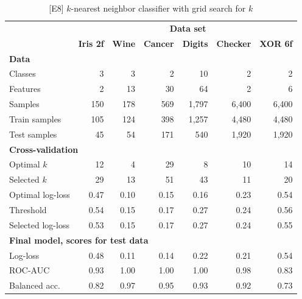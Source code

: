 \begin{table}
\caption{[E8] $k$-nearest neighbor classifier with grid search for $k$}
\label{tab_e8}
%
\begin{center}
\small
\begin{tabular}{|lrrrrrr|}
\hline
&\multicolumn{6}{c|}{\textbf{\hrulefill\ Data set \hrulefill}}\\
&\textbf{Iris 2f}&\textbf{Wine}&\textbf{Cancer}&\textbf{Digits}&\textbf{Checker}&\textbf{XOR 6f}\\
\multicolumn{7}{|l|}{\textbf{Data}}\\
Classes&3&3&2&10&2&2\\
Features&2&13&30&64&2&6\\
Samples&150&178&569&1,797&6,400&6,400\\
Train samples&105&124&398&1,257&4,480&4,480\\
Test samples&45&54&171&540&1,920&1,920\\
\multicolumn{7}{|l|}{\textbf{Cross-validation}}\\
Optimal $k$&12&4&29&8&10&14\\
Selected $k$&29&13&51&43&11&20\\
Optimal log-loss&0.47&0.10&0.15&0.16&0.23&0.54\\
Threshold&0.54&0.15&0.17&0.27&0.24&0.56\\
Selected log-loss&0.53&0.15&0.17&0.27&0.24&0.55\\
\multicolumn{7}{|l|}{\textbf{Final model, scores for test data}}\\
Log-loss&0.48&0.11&0.14&0.22&0.21&0.54\\
ROC-AUC&0.93&1.00&1.00&1.00&0.98&0.83\\
Balanced acc.&0.82&0.97&0.95&0.93&0.92&0.73\\
\hline
\end{tabular}
\end{center}
\end{table}
%
